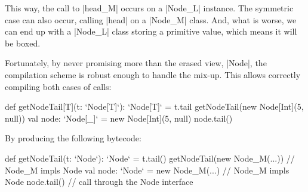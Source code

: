 This way, the call to |head_M| occurs on a |Node_L| instance. The symmetric case can also occur, calling |head| on a |Node_M| class. And, what is worse, we can end up with a |Node_L| class storing a primitive value, which means it will be boxed.

Fortunately, by never promising more than the erased view, |Node|, the compilation scheme is robust enough to handle the mix-up. This allows correctly compiling both cases of calls:

\begin{lstlisting-nobreak}
 def getNodeTail[T](t: `Node[T]`): `Node[T]` = t.tail
 getNodeTail(new Node[Int](5, null))
 val node: `Node[_]` = new Node[Int](5, null)
 node.tail()
\end{lstlisting-nobreak}

By producing the following bytecode:

\begin{lstlisting-nobreak}
 def getNodeTail(t: `Node`): `Node` = t.tail()
 getNodeTail(new Node_M(...))                // Node_M impls Node
 val node: `Node` = new Node_M(...) // Node_M impls Node
 node.tail() // call through the Node interface
\end{lstlisting-nobreak}


